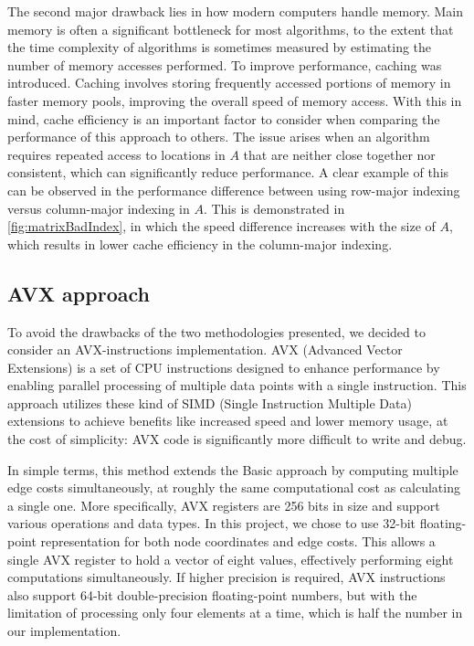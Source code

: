 The second major drawback lies in how modern computers handle memory.
Main memory is often a significant bottleneck for most algorithms, to the extent that the time complexity of algorithms is sometimes measured by estimating the number of memory accesses performed.
To improve performance, caching was introduced.
Caching involves storing frequently accessed portions of memory in faster memory pools, improving the overall speed of memory access.
With this in mind, cache efficiency is an important factor to consider when comparing the performance of this approach to others.
The issue arises when an algorithm requires repeated access to locations in $A$ that are neither close together nor consistent, which can significantly reduce performance.
A clear example of this can be observed in the performance difference between using row-major indexing versus column-major indexing in $A$.
This is demonstrated in \figurename{ \ref{fig:matrixBadIndex}}, in which the speed difference increases with the size of $A$, which results in lower cache efficiency in the column-major indexing.

\subsection{AVX approach}
To avoid the drawbacks of the two methodologies presented, we decided to consider an AVX-instructions implementation.
AVX (Advanced Vector Extensions)\cite{avxWikipedia} is a set of CPU instructions designed to enhance performance by enabling parallel processing of multiple data points with a single instruction.
This approach utilizes these kind of SIMD (Single Instruction Multiple Data) extensions to achieve benefits like increased speed and lower memory usage, at the cost of simplicity: AVX code is significantly more difficult to write and debug.

In simple terms, this method extends the Basic approach by computing multiple edge costs simultaneously, at roughly the same computational cost as calculating a single one.
More specifically, AVX registers are 256 bits in size and support various operations and data types. 
In this project, we chose to use 32-bit floating-point representation for both node coordinates and edge costs.
This allows a single AVX register to hold a vector of eight values, effectively performing eight computations simultaneously.
If higher precision is required, AVX instructions also support 64-bit double-precision floating-point numbers, but with the limitation of processing only four elements at a time, which is half the number in our implementation.


